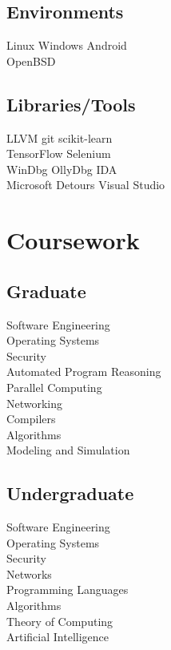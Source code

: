 \documentclass[]{deedy-resume-openfont}
\begin{document}
\begin{minipage}[t]{0.33\textwidth}
\subsection{Environments}
Linux \textbullet{} Windows \textbullet{} Android \\ 
OpenBSD
\sectionsep

\subsection{Libraries/Tools}
LLVM \textbullet{} git \textbullet{} scikit-learn \\
TensorFlow \textbullet{} Selenium \textbullet{} \\ 
WinDbg \textbullet{} OllyDbg \textbullet{} IDA \\
Microsoft Detours \textbullet{} Visual Studio
\sectionsep



\section{Coursework}
\subsection{Graduate}

Software Engineering \\
Operating Systems \\
Security \\
Automated Program Reasoning \\
Parallel Computing \\
Networking \\
Compilers \\
Algorithms \\
Modeling and Simulation
\sectionsep

\subsection{Undergraduate}
Software Engineering \\
Operating Systems \\
Security \\
Networks \\
Programming Languages \\
Algorithms \\
Theory of Computing \\
Artificial Intelligence\\
\sectionsep

%
%

\end{minipage} 
\end{document}
